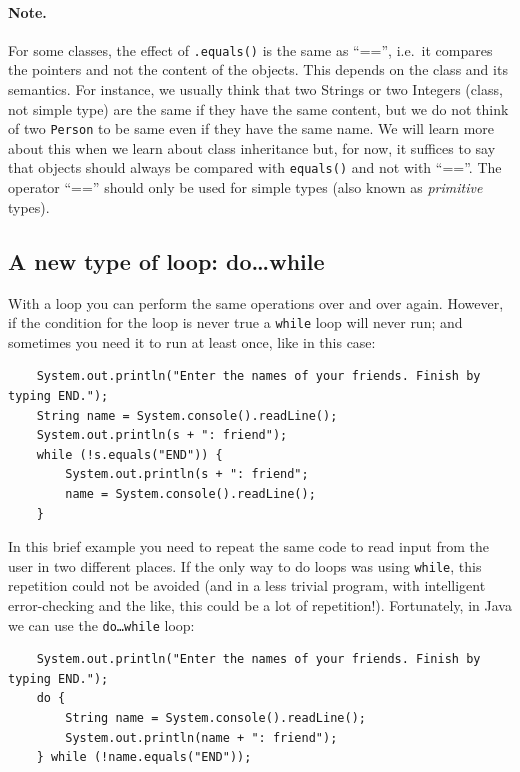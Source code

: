 \paragraph{Note.}
\label{sec:notre}

For some classes, the effect of \verb+.equals()+ is the same as
``=='', i.e.~it compares the pointers and not the content of the
objects. This depends on the class and its semantics. For instance,
we usually think that two Strings or two Integers (class, not simple
type) are the same if they have the same content, but we do not think
of two \verb+Person+ to be same even if they have the same name. We
will learn more about this when we learn about class inheritance but,
for now, it suffices to say that objects should always be compared
with \verb+equals()+ and not with ``==''. The operator ``=='' should
only be used for simple types (also known as \emph{primitive} types). 

\subsection{A new type of loop: do\ldots while}
\label{sec:new-type-loop}

With a loop you can perform the same operations over and over
again. However, if the condition for the loop is never true a
\texttt{while} loop will never run; and sometimes you need it to run
at least once, like in this case:

\begin{verbatim}
    System.out.println("Enter the names of your friends. Finish by typing END.");
    String name = System.console().readLine();
    System.out.println(s + ": friend");
    while (!s.equals("END")) {
        System.out.println(s + ": friend";
        name = System.console().readLine();
    }
\end{verbatim}

In this brief example you need to repeat the same code to read input
from the user in two different places. If
the only way to do loops was using \texttt{while}, this repetition
could not be avoided (and in a less trivial program, with
intelligent error-checking and the like, this could be a lot of
repetition!). Fortunately, in Java we can use 
the \texttt{do\ldots while} loop: 

\begin{verbatim}
    System.out.println("Enter the names of your friends. Finish by typing END.");
    do {
        String name = System.console().readLine();
        System.out.println(name + ": friend");
    } while (!name.equals("END"));
\end{verbatim}


